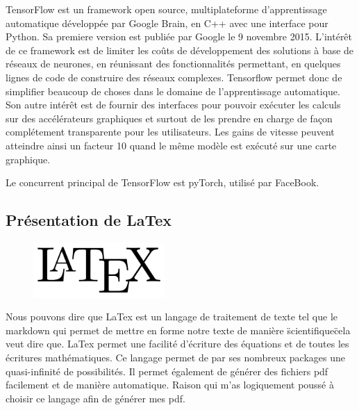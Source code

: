 TensorFlow est un framework open source,
multiplateforme d'apprentissage automatique développée par Google Brain,
en C++ avec une interface pour Python.
Sa premiere version est publiée par Google le 9 novembre 2015.
L'intérêt de ce framework est de limiter les coûts de développement des solutions à base
de réseaux de neurones, en réunissant des fonctionnalités permettant,
en quelques lignes de code de construire des réseaux complexes.
Tensorflow permet donc de simplifier beaucoup de choses dans
le domaine de l'apprentissage automatique.
Son autre intérêt est de fournir des interfaces pour pouvoir exécuter les calculs sur
des accélérateurs graphiques et surtout de les prendre en charge
de façon complétement transparente pour les utilisateurs.
Les gains de vitesse peuvent atteindre ainsi un facteur 10 quand le même modèle est exécuté
sur une carte graphique.

Le concurrent principal de TensorFlow est pyTorch, utilisé par FaceBook.

\hypertarget{Pruxe9sentation-de-LaTex}{%
\subsection{Présentation de LaTex}
\label{Pruxe9sentation-de-LaTex}}

\begin{figure}[h]
  \begin{center}
\includegraphics[width=5cm]{./images/Latex.png}
\end{center}
\end{figure}

Nous pouvons dire que LaTex est un langage de traitement de texte tel que le markdown qui permet de mettre en forme notre texte de manière \"scientifique\" cela veut dire que. LaTex permet une facilité d'écriture des équations et de toutes les écritures mathématiques. Ce langage permet de par ses nombreux packages une quasi-infinité de possibilités. Il permet également de générer des fichiers pdf facilement et de manière automatique. Raison qui m'as logiquement poussé à choisir ce langage afin de générer mes pdf.
